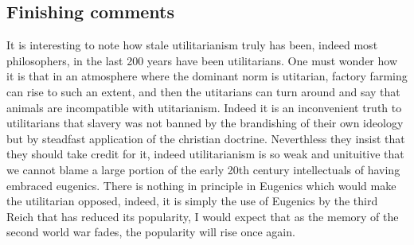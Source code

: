 \subsection{Finishing comments}

It is interesting to note how stale utilitarianism truly has been, indeed most philosophers, in the last 200 years have been utilitarians. One must wonder how it is that in an atmosphere where the dominant norm is utitarian, factory farming can rise to such an extent, and then the utitarians can turn around and say that animals are incompatible with utitarianism. Indeed it is an inconvenient truth to utilitarians that slavery was not banned by the brandishing of their own ideology but by steadfast application of the christian doctrine. Neverthless they insist that they should take credit for it, indeed utilitarianism is so weak and unituitive that we cannot blame a large portion of the early 20th century intellectuals of having embraced eugenics. There is nothing in principle in Eugenics which would make the utilitarian opposed, indeed, it is simply the use of Eugenics by the third Reich that has reduced its popularity, I would expect that as the memory of the second world war fades, the popularity will rise once again. 
